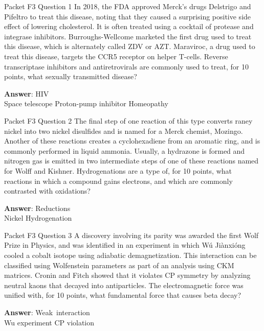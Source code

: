 \begin{frame}{Packet F3 Question 1}
In 2018, the FDA approved   Merck’s drugs Delstrigo   and Pifeltro to treat this disease, noting that they caused a surprising positive side effect of lowering cholesterol. It is often treated using a cocktail of protease and integrase inhibitors. Burroughs-Wellcome marketed the first drug used to treat this disease, which is alternately called ZDV or AZT. Maraviroc, a drug used to treat   this disease, targets the CCR5 receptor on helper T-cells.   Reverse transcriptase inhibitors and antiretrovirals are commonly used to treat, for 10 points, what sexually transmitted disease?  

\textbf{Answer}: HIV\\
 Space telescope
 Proton-pump inhibitor
 Homeopathy
\end{frame}

\begin{frame}{Packet F3 Question 2}
The final step of one reaction of this type converts raney nickel     into two nickel   disulfides and is named for a Merck chemist, Mozingo. Another   of these reactions creates a cyclohexadiene from an aromatic ring, and is commonly performed in liquid ammonia. Usually, a hydrazone is formed   and nitrogen gas   is emitted in two intermediate steps of one of these reactions named for Wolff and Kishner. Hydrogenations are a type of, for 10 points, what reactions in which a compound gains electrons, and which are commonly contrasted with oxidations?

\textbf{Answer}: Reductions\\
 Nickel
 Hydrogenation
\end{frame}

\begin{frame}{Packet F3 Question 3}
A discovery involving its parity was awarded   the first Wolf Prize in Physics, and was identified in an experiment in which Wú Jiànxióng cooled a cobalt isotope using adiabatic demagnetization. This interaction can be classified   using Wolfenstein parameters as part of an analysis using CKM matrices. Cronin   and Fitch showed that it violates CP symmetry by analyzing neutral kaons that   decayed into antiparticles. The electromagnetic force was   unified with, for 10 points, what fundamental force that causes beta decay?

\textbf{Answer}: Weak\ interaction\\
 Wu experiment
 CP violation
\end{frame}

